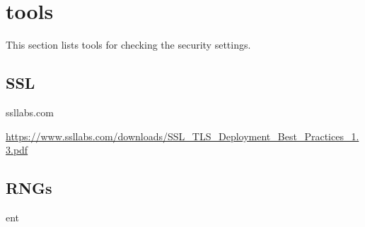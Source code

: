 \section{tools}

This section lists tools for checking the security settings.

\subsection{SSL}

ssllabs.com


\url{https://www.ssllabs.com/downloads/SSL_TLS_Deployment_Best_Practices_1.3.pdf}		%


\subsection{RNGs}

ent



